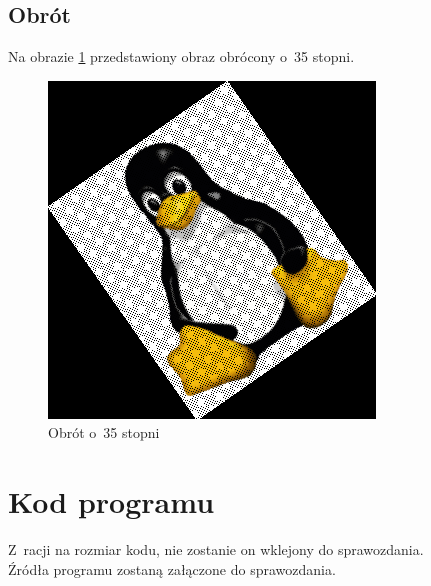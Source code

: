 \documentclass[a4paper, 12pt]{article}
\begin{document}
\subsection{Obrót}
Na obrazie \ref{fig:rot} przedstawiony obraz obrócony o~35 stopni.
\begin{figure}[p]
\includegraphics{rot}
\caption{Obrót o~35 stopni}
\label{fig:rot}
\end{figure}
\section{Kod programu}
Z~racji na rozmiar kodu, nie zostanie on wklejony do sprawozdania.\\
Źródła programu zostaną załączone do sprawozdania.
\end{document}

